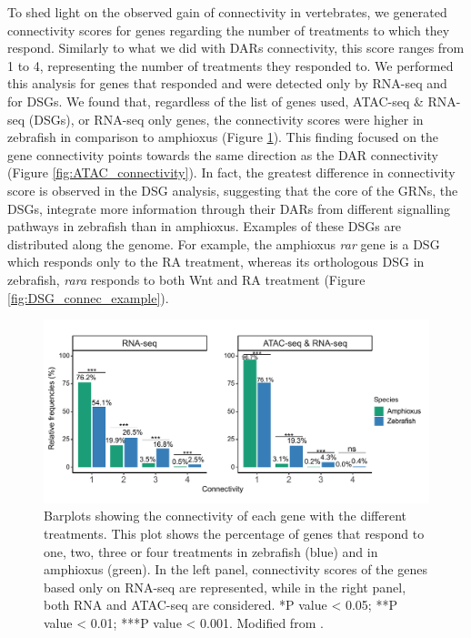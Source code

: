  
To shed light on the observed gain of connectivity in vertebrates, we generated connectivity scores for genes regarding the number of treatments to which they respond. Similarly to what we did with DARs connectivity, this score ranges from 1 to 4, representing the number of treatments they responded to. We performed this analysis for genes that responded and were detected only by RNA-seq and for DSGs. We found that, regardless of the list of genes used, ATAC-seq \& RNA-seq (DSGs), or RNA-seq only genes, the connectivity scores were higher in zebrafish in comparison to amphioxus (Figure \ref{fig:Connectivity_genes}). This finding focused on the gene connectivity points towards the same direction as the DAR connectivity (Figure \ref{fig:ATAC_connectivity}). In fact, the greatest difference in connectivity score is observed in the DSG analysis, suggesting that the core of the GRNs, the DSGs, integrate more information through their DARs from different signalling pathways in zebrafish than in amphioxus. Examples of these DSGs are distributed along the genome. For example, the amphioxus \textit{rar} gene is a DSG which responds only to the RA treatment, whereas its orthologous DSG in zebrafish, \textit{rara} responds to both Wnt and RA treatment (Figure \ref{fig:DSG_connec_example}).


\begin{figure}[hp]
\centering
\includegraphics[width=1\textwidth]{Figures/Connectivity_genes}
\caption[Connectivity of genes]{
Barplots showing the connectivity of each gene with the different treatments. This plot shows the percentage of genes that respond to one, two, three or four treatments in zebrafish (blue) and in amphioxus (green). In the left panel, connectivity scores of the genes based only on RNA-seq are represented, while in the right panel, both RNA and ATAC-seq are considered. *P value < 0.05; **P value < 0.01; ***P value < 0.001. Modified from \parencite{gil-galvez_gain_2022}. }
\label{fig:Connectivity_genes}
\end{figure} 


